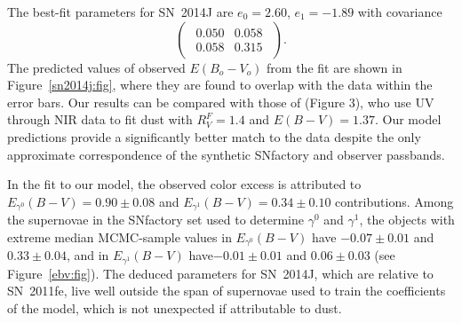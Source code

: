 \documentclass{aastex61}   	%
\begin{document}
The best-fit parameters for SN~2014J are 
$e_0= 2.60$, $ e_1=-1.89$ with covariance
\begin{equation}
\begin{pmatrix}
\begin{array}{rr}
0.050 & 0.058 \\
0.058 & 0.315
\end{array}
\end{pmatrix}.
\end{equation}
The predicted values of observed $E(B_o-V_o)$ from the fit are shown in Figure~\ref{sn2014j:fig}, where they are found to
overlap with the data within the error bars.   
Our results can be compared with those of  \citet{2014ApJ...788L..21A} (Figure 3), who 
use
UV through NIR data to fit \citet{1999PASP..111...63F} dust with $R_V^F=1.4$ and $E(B-V)=1.37$.
Our model predictions provide a significantly better match to the data
despite the only approximate correspondence of the synthetic SNfactory and \citet{2014ApJ...788L..21A} observer passbands.


In the fit to our model, the observed color excess is attributed to 
$E_{\gamma^0}(B-V)=  0.90 \pm   0.08$ and  $E_{\gamma^1}(B-V)=  0.34 \pm   0.10$
contributions.
Among the supernovae in the SNfactory  set used to determine $\gamma^0$ and $\gamma^1$, the
objects with extreme median MCMC-sample values in $E_{\gamma^0}(B-V)$ have 
$-0.07 \pm 0.01$ and  $  0.33 \pm 0.04$, and in $E_{\gamma^1}(B-V)$  have$-0.01 \pm 0.01$  and
$  0.06 \pm 0.03$ 
(see Figure~\ref{ebv:fig}).
The deduced parameters for SN~2014J, which are relative to SN~2011fe, live well outside the 
span of supernovae used to train the coefficients of the model, which is not unexpected if
attributable to dust. 
\end{document}
